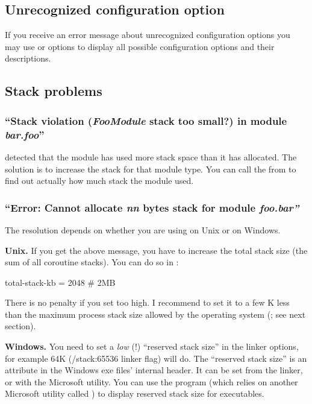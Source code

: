 \subsection{Unrecognized configuration option}

If you receive an error message about unrecognized configuration
options you may use  or  options
to display all possible configuration options and their descriptions.

\subsection{Stack problems}

\subsubsection{``Stack violation (\textit{FooModule} stack too small?) in module \textit{bar.foo}''}

{\opp} detected that the module has used more stack space than it has
allocated. The solution is to increase the stack for that module type.
You can call the  from  to find out
actually how much stack the module used.


\subsubsection{``Error: Cannot allocate \textit{nn} bytes stack for module \textit{foo.bar''}}

The resolution depends on whether you are using {\opp} on Unix or on Windows.

\textbf{Unix.}
If you get the above message, you have to increase the total stack
size (the sum of all coroutine stacks). You can do
so in :

\begin{inifile}
[General]
total-stack-kb = 2048 # 2MB
\end{inifile}

There is no penalty if you set  too high. I
recommend to set it to a few K less than the maximum process stack
size allowed by the operating system (; see
next section).


\textbf{Windows.}
You need to set a \textit{low} (!) ``reserved stack size''
in the linker options, for example 64K (/stack:65536 linker flag) will do.
The ``reserved stack size'' is an attribute in the Windows exe
files' internal header. It can be set from the linker, or with
the  Microsoft utility. You can use the 
program (which relies on another Microsoft utility called )
to display reserved stack size for executables.

